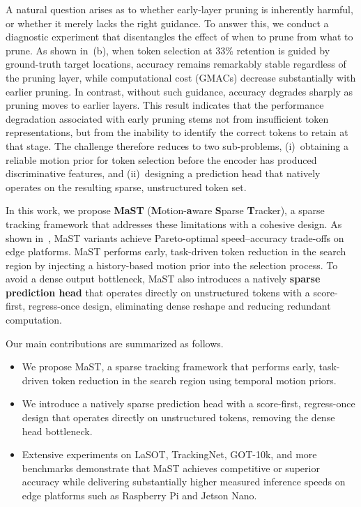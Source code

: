 A natural question arises as to whether early-layer pruning is inherently
harmful, or whether it merely lacks the right guidance.
To answer this, we conduct a diagnostic experiment that disentangles
the effect of when to prune from what to prune.
As shown in~(b), when token selection at
33\% retention is guided by ground-truth target locations, accuracy
remains remarkably stable regardless of the pruning layer, while computational cost (GMACs) decrease substantially with earlier pruning.
In contrast, without such guidance, accuracy degrades sharply as
pruning moves to earlier layers.
This result indicates that the performance degradation associated with
early pruning stems not from insufficient token representations, but
from the inability to identify the correct tokens to retain at that
stage.
The challenge therefore reduces to two sub-problems,
(i)~obtaining a reliable motion prior for token selection
before the encoder has produced discriminative features, and
(ii)~designing a prediction head that natively operates on the
resulting sparse, unstructured token set.

In this work, we propose \textbf{MaST}
(\textbf{M}otion-\textbf{a}ware \textbf{S}parse \textbf{T}racker),
a sparse tracking framework that addresses these
limitations with a cohesive design.
As shown in~, MaST variants achieve
Pareto-optimal speed–accuracy trade-offs on edge platforms.
%
MaST performs early, task-driven token reduction in the search region by
injecting a history-based motion prior into the selection process.
To avoid a dense output bottleneck, MaST also introduces a natively
\textbf{sparse prediction head} that operates directly on unstructured
tokens with a score-first, regress-once design, eliminating dense
reshape and reducing redundant computation.


Our main contributions are summarized as follows.
\begin{itemize}
  \item We propose MaST, a sparse tracking framework that performs early,
        task-driven token reduction in the search region using temporal
        motion priors.

  \item We introduce a natively sparse prediction head with a
        score-first, regress-once design that operates directly on
        unstructured tokens, removing the dense head bottleneck.

  \item Extensive experiments on LaSOT, TrackingNet, GOT-10k, and more
        benchmarks demonstrate that MaST achieves competitive or superior
        accuracy while delivering substantially higher measured inference
        speeds on edge platforms such as Raspberry Pi and Jetson Nano.
\end{itemize}